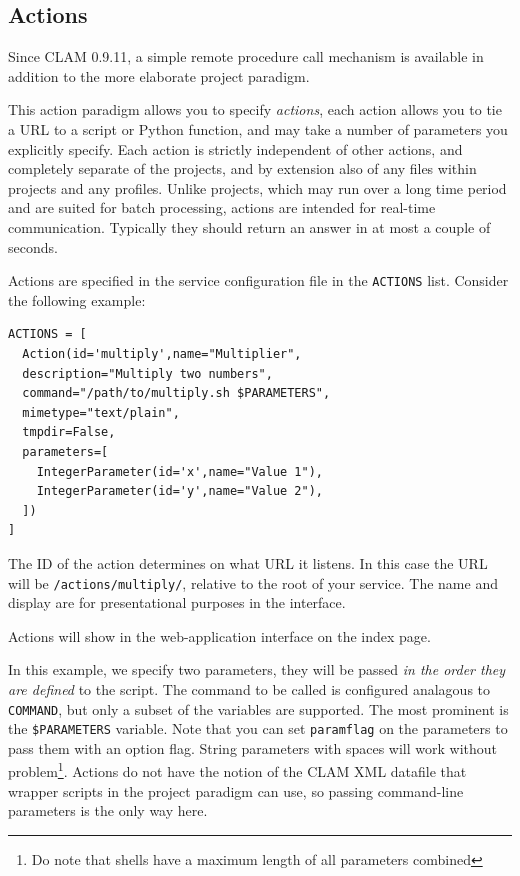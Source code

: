 \documentclass[a4paper,12pt,twoside,openright]{report}
\begin{document}
\subsection{Actions}

Since CLAM 0.9.11, a simple remote procedure call mechanism is available in
addition to the more elaborate project paradigm. 

This action paradigm allows you to specify \emph{actions}, each action allows
you to tie a URL to a script or Python function, and may take a number of
parameters you explicitly specify. Each action is strictly independent of other
actions, and completely separate of the projects, and by extension also of any
files within projects and any profiles. Unlike projects, which may run over a
long time period and are suited for batch processing, actions are intended for
real-time communication. Typically they should return an answer in at most a
couple of seconds.

Actions are specified in the service configuration file in the \texttt{ACTIONS}
list. Consider the following example:


{ \small
\begin{verbatim}
ACTIONS = [
  Action(id='multiply',name="Multiplier",
  description="Multiply two numbers",
  command="/path/to/multiply.sh $PARAMETERS",
  mimetype="text/plain",
  tmpdir=False,
  parameters=[
    IntegerParameter(id='x',name="Value 1"),
    IntegerParameter(id='y',name="Value 2"),
  ])
]
\end{verbatim}
}

The ID of the action determines on what URL it listens. In this case the URL
will be \texttt{/actions/multiply/}, relative to the root of your service. The
name and display are for presentational purposes in the interface.

Actions will show in the web-application interface on the index page.

In this example, we specify two parameters, they will be passed \emph{in the
order they are defined} to the script. The command to be called is configured
analagous to \texttt{COMMAND}, but only a subset of the variables are
supported. The most prominent is the \texttt{\$PARAMETERS} variable. Note that
you can set \texttt{paramflag} on the parameters to pass them with an option
flag. String parameters with spaces will work without problem\footnote{Do note that
shells have a maximum length of all parameters combined}. Actions do not have
the notion of the CLAM XML datafile that wrapper scripts in the project
paradigm can use, so passing command-line parameters is the only way here.
\end{document}
